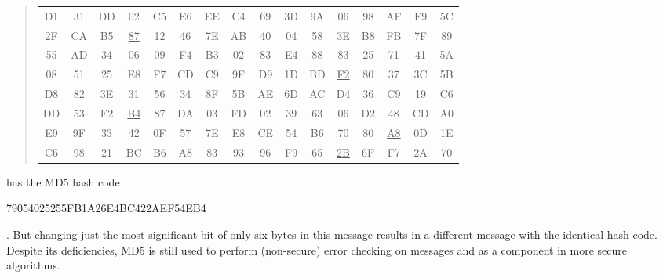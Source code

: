 \begin{scriptsize}\begin{code}\begin{quote}
\begin{tabular}{cccccccccccccccc}
  D1 & 31 & DD & 02 & C5 & E6 & EE & C4 & 69 & 3D & 9A & 06 & 98 & AF & F9 & 5C \\
  2F & CA & B5 & \underline{87} & 12 & 46 & 7E & AB & 40 & 04 & 58 & 3E & B8 & FB & 7F & 89 \\
  55 & AD & 34 & 06 & 09 & F4 & B3 & 02 & 83 & E4 & 88 & 83 & 25 & \underline{71} & 41 & 5A \\
  08 & 51 & 25 & E8 & F7 & CD & C9 & 9F & D9 & 1D & BD & \underline{F2} & 80 & 37 & 3C & 5B \\
  D8 & 82 & 3E & 31 & 56 & 34 & 8F & 5B & AE & 6D & AC & D4 & 36 & C9 & 19 & C6 \\
  DD & 53 & E2 & \underline{B4} & 87 & DA & 03 & FD & 02 & 39 & 63 & 06 & D2 & 48 & CD & A0 \\
  E9 & 9F & 33 & 42 & 0F & 57 & 7E & E8 & CE & 54 & B6 & 70 & 80 & \underline{A8} & 0D & 1E \\
  C6 & 98 & 21 & BC & B6 & A8 & 83 & 93 & 96 & F9 & 65 & \underline{2B} & 6F & F7 & 2A & 70
\end{tabular}
\end{quote}\end{code}\end{scriptsize}

\noindent
has the MD5 hash code \begin{code}79054025255FB1A26E4BC422AEF54EB4\end{code}.
But changing just the most-significant bit of only six bytes in this message results in
a different message with the identical hash code.
Despite its deficiencies, MD5 is still used to perform (non-secure) error checking on messages and
as a component in more secure algorithms.

